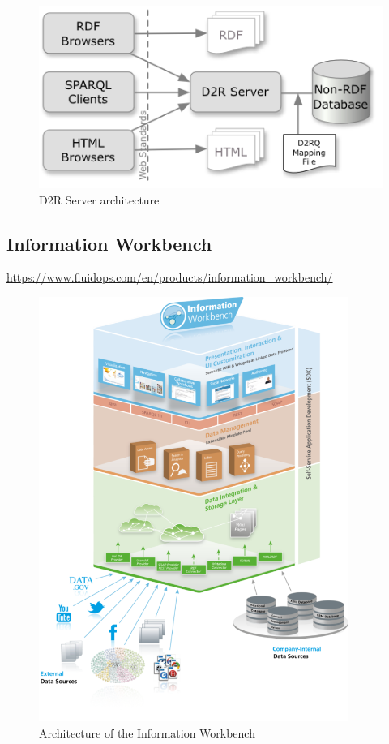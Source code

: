 \begin{figure}[ht]
	\centering
\includegraphics[width=\textwidth]{img/d2r_architecture.png}
	\caption{D2R Server architecture}
	\label{d2r_architecture}
\end{figure}

\subsection{Information Workbench}

\url{https://www.fluidops.com/en/products/information_workbench/}

\cite{haase2011information}

\begin{figure}[ht]
	\centering
\includegraphics[width=0.9\textwidth]{img/information_workbench_architecture.png}
	\caption{Architecture of the Information Workbench}
	\label{iw_architecture}
\end{figure}

